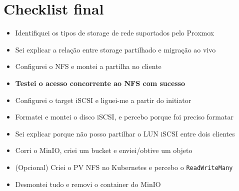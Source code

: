 \documentclass[11pt,a4paper]{article}
\begin{document}
\section{Checklist final}

\begin{itemize}
  \item[$\square$] Identifiquei os tipos de storage de rede suportados pelo Proxmox
  \item[$\square$] Sei explicar a relação entre storage partilhado e migração ao vivo
  \item[$\square$] Configurei o NFS e montei a partilha no cliente
  \item[$\square$] \textbf{Testei o acesso concorrente ao NFS com sucesso}
  \item[$\square$] Configurei o target iSCSI e liguei-me a partir do initiator
  \item[$\square$] Formatei e montei o disco iSCSI, e percebo porque foi preciso formatar
  \item[$\square$] Sei explicar porque não posso partilhar o LUN iSCSI entre dois clientes
  \item[$\square$] Corri o MinIO, criei um bucket e enviei/obtive um objeto
  \item[$\square$] (Opcional) Criei o PV NFS no Kubernetes e percebo o \texttt{ReadWriteMany}
  \item[$\square$] Desmontei tudo e removi o container do MinIO
\end{itemize}
\end{document}
